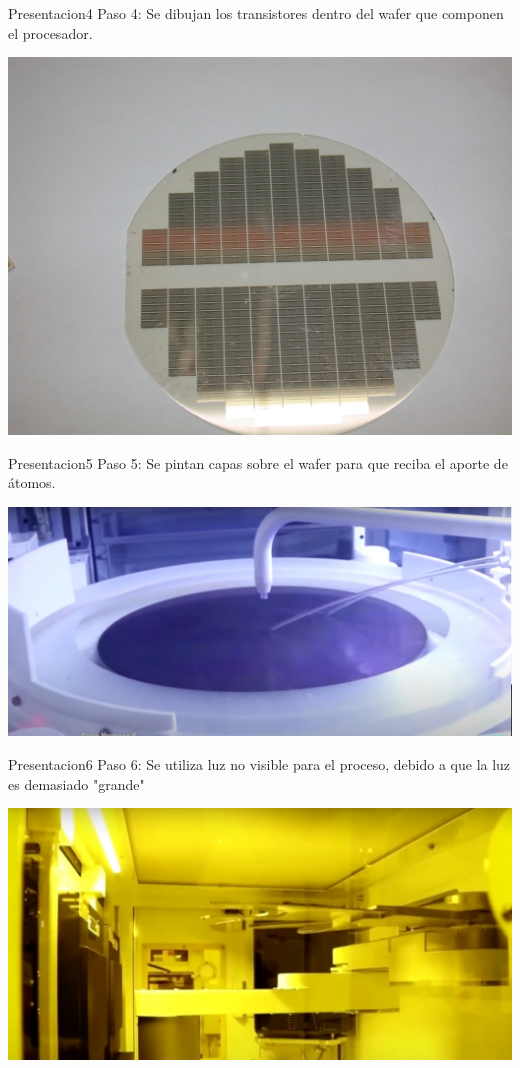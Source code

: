 \documentclass[presentation]{beamer}
\begin{document}
\begin{frame}[label={sec:orga676fec}]{Presentacion4}
Paso 4:
Se dibujan los transistores dentro del wafer que componen el procesador.
\begin{center}
\includegraphics[width=.9\linewidth]{./paso4.jpeg}
\end{center}
\end{frame}

\begin{frame}[label={sec:org2db05cf}]{Presentacion5}
Paso 5:
Se pintan capas sobre el wafer para que reciba el aporte de átomos.
\begin{center}
\includegraphics[width=.9\linewidth]{./paso5.jpeg}
\end{center}
\end{frame}

\begin{frame}[label={sec:org25d3c5d}]{Presentacion6}
Paso 6:
Se utiliza luz no visible para el proceso, debido a que la luz es demasiado "grande"
\begin{center}
\includegraphics[width=.9\linewidth]{./paso6.jpeg}
\end{center}
\end{frame}
\end{document}
